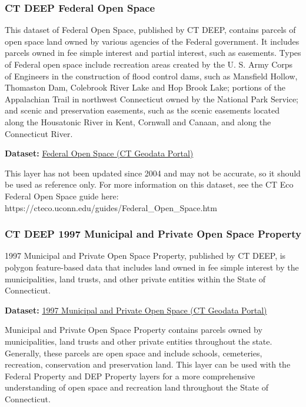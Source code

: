 \documentclass[
  letterpaper,
  DIV=11,
  numbers=noendperiod]{scrreprt}
\begin{document}
\subsubsection{CT DEEP Federal Open
Space}\label{sec-ct-deep-federal-open-space}

This dataset of Federal Open Space, published by CT DEEP, contains
parcels of open space land owned by various agencies of the Federal
government. It includes parcels owned in fee simple interest and partial
interest, such as easements. Types of Federal open space include
recreation areas created by the U. S. Army Corps of Engineers in the
construction of flood control dams, such as Mansfield Hollow, Thomaston
Dam, Colebrook River Lake and Hop Brook Lake; portions of the
Appalachian Trail in northwest Connecticut owned by the National Park
Service; and scenic and preservation easements, such as the scenic
easements located along the Housatonic River in Kent, Cornwall and
Canaan, and along the Connecticut River.

\textbf{Dataset:}
\href{https://geodata.ct.gov/datasets/CTDEEP::federal-open-space/about}{Federal
Open Space (CT Geodata Portal)}

This layer has not been updated since 2004 and may not be accurate, so
it should be used as reference only. For more information on this
dataset, see the CT Eco Federal Open Space guide here:
https://cteco.uconn.edu/guides/Federal\_Open\_Space.htm

\subsubsection{CT DEEP 1997 Municipal and Private Open Space
Property}\label{sec-ct-deep-1997-municipal-and-private-open-space-property}

1997 Municipal and Private Open Space Property, published by CT DEEP, is
polygon feature-based data that includes land owned in fee simple
interest by the municipalities, land trusts, and other private entities
within the State of Connecticut.

\textbf{Dataset:}
\href{https://geodata.ct.gov/datasets/CTDEEP::1997-municipal-and-private-open-space/about}{1997
Municipal and Private Open Space (CT Geodata Portal)}

Municipal and Private Open Space Property contains parcels owned by
municipalities, land trusts and other private entities throughout the
state. Generally, these parcels are open space and include schools,
cemeteries, recreation, conservation and preservation land. This layer
can be used with the Federal Property and DEP Property layers for a more
comprehensive understanding of open space and recreation land throughout
the State of Connecticut.
\end{document}
